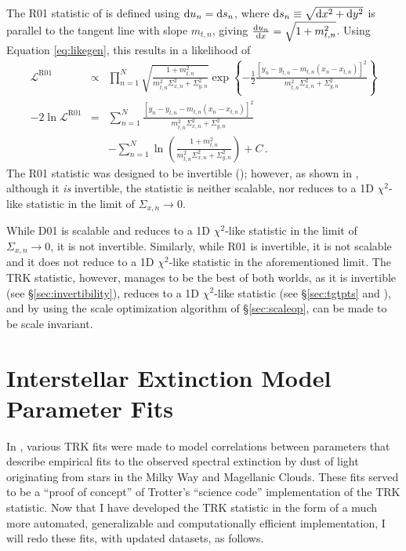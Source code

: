 The R01 statistic of \textcite{r01} is defined using $\mathop{}\!\mathrm{d} u_n = \mathop{}\!\mathrm{d} s_n$, where $\mathop{}\!\mathrm{d} s_n\equiv\sqrt{\mathop{}\!\mathrm{d} x^2+\mathop{}\!\mathrm{d} y^2}$ is parallel to the tangent line with slope $m_{t,n}$, giving $\dv{u_n}{x}=\sqrt{1+m_{t,n}^2}$. Using Equation \eqref{eq:likegen}, this results in a likelihood of
\begin{eqnarray}\label{eq:R01}
\mathcal{L}^{\mathrm {R01}} & \propto & \prod_{n=1}^{N}{\sqrt{\frac{1+m_{t,n}^2}{m_{t,n}^2\Sigma_{x,n}^2+\Sigma_{y,n}^2}}\exp{\left\{-\frac{1}{2}\frac{\left[y_n-y_{t,n}-m_{t,n}(x_n-x_{t,n})\right]^2}{m_{t,n}^2\Sigma_{x,n}^2+\Sigma_{y,n}^2}\right\}}} \nonumber \\
-2\ln\mathcal{L}^{\mathrm{R01}} & = & \sum_{n=1}^{N}{\frac{\left[y_n-y_{t,n}-m_{t,n}(x_n-x_{t,n})\right]^2}{m_{t,n}^2\Sigma_{x,n}^2+\Sigma_{y,n}^2}} \nonumber \\
& & - \sum_{n=1}^{N}{\ln\left(\frac{1+m_{t,n}^2}{m_{t,n}^2\Sigma_{x,n}^2+\Sigma_{y,n}^2}\right)} + C \, .
\end{eqnarray}
The R01 statistic was designed to be invertible (\textcite{r01}); however, as shown in \textcite{trotter}, although it \textit{is} invertible, the statistic is neither scalable, nor reduces to a 1D $\chi^2$-like statistic in the limit of $\Sigma_{x,n}\rightarrow 0$.


While D01 is scalable and reduces to a 1D $\chi^2$-like statistic in the limit of $\Sigma_{x,n}\rightarrow 0$, it is not invertible. Similarly, while R01 is invertible, it is not scalable and it does not reduce to a 1D $\chi^2$-like statistic in the aforementioned limit. The TRK statistic, however, manages to be the best of both worlds, as it is invertible (see \S\ref{sec:invertibility}), reduces to a 1D $\chi^2$-like statistic (see \S\ref{sec:tgtpts} and \textcite{trotter}), and by using the scale optimization algorithm of \S\ref{sec:scaleop}, can be made to be scale invariant.

\section{Interstellar Extinction Model Parameter Fits}
\label{sec:extincfits}
In \textcite{trotter}, various TRK fits were made to model correlations between parameters that describe empirical fits to the observed spectral extinction by dust of light originating from stars in the Milky Way and Magellanic Clouds. These fits served to be a ``proof of concept'' of Trotter's ``science code'' implementation of the TRK statistic. Now that I have developed the TRK statistic in the form of a much more automated, generalizable and computationally efficient implementation, I will redo these fits, with updated datasets, as follows.

